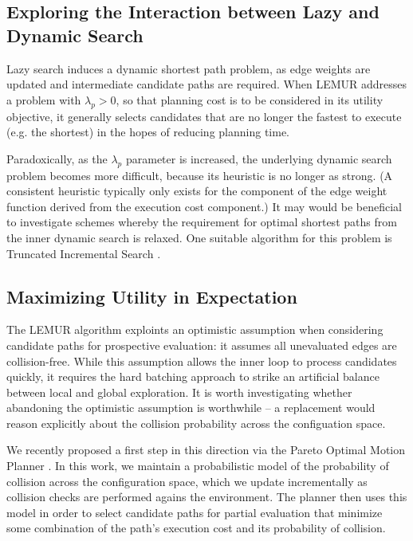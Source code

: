 \subsection{Exploring the Interaction between Lazy and Dynamic Search}

Lazy search induces a dynamic shortest path problem,
as edge weights are updated and intermediate candidate paths are
required.
When LEMUR addresses a problem with $\lambda_p > 0$,
so that planning cost is to be considered in its utility objective,
it generally selects candidates that are no longer the fastest
to execute (e.g. the shortest) in the hopes of reducing planning time.

Paradoxically,
as the $\lambda_p$ parameter is increased,
the underlying dynamic search problem becomes more difficult,
because its heuristic is no longer as strong.
(A consistent heuristic typically only exists for the component of
the edge weight function derived from the execution cost component.)
It may would be beneficial to investigate schemes whereby
the requirement for optimal shortest paths from the inner
dynamic search is relaxed.
One suitable algorithm for this problem is Truncated
Incremental Search \citep{aine2016truncatedincremental}.

\subsection{Maximizing Utility in Expectation}

The LEMUR algorithm exploints an optimistic assumption when considering
candidate paths for prospective evaluation:
it assumes all unevaluated edges are collision-free.
While this assumption allows the inner loop to process candidates
quickly,
it requires the hard batching approach to strike an artificial
balance between local and global exploration.
It is worth investigating whether abandoning the optimistic
assumption is worthwhile --
a replacement would reason explicitly about the collision probability
across the configuation space.

We recently proposed a first step in this direction
via the Pareto Optimal Motion Planner \citep{choudhury2016pomp}.
In this work,
we maintain a probabilistic model of the probability of collision
across the configuration space,
which we update incrementally as collision checks are performed
agains the environment.
The planner then uses this model in order to select candidate paths
for partial evaluation that minimize some combination of the path's
execution cost and its probability of collision.



